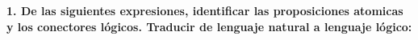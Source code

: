 \noindent\textbf{1. De las siguientes expresiones, identificar las proposiciones atomicas y los conectores lógicos. Traducir de lenguaje natural a lenguaje lógico:}